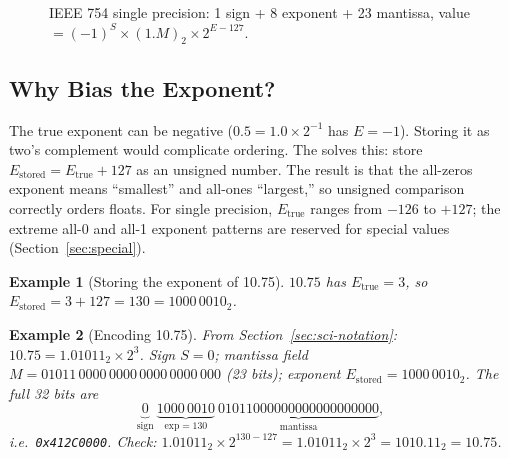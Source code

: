 \documentclass[11pt]{article}
\newtheorem{example}{Example}[section]
\begin{document}
\begin{figure}[h]
  \centering
  \caption{IEEE 754 single precision: 1 sign + 8 exponent + 23 mantissa, value $= (-1)^S \times (1.M)_2 \times 2^{E-127}$.}
  \label{fig:layout}
\end{figure}

\subsection{Why Bias the Exponent?}

The true exponent can be negative ($0.5 = 1.0 \times 2^{-1}$ has $E=-1$). Storing it as two's complement would complicate ordering. The  solves this: store $E_{\text{stored}} = E_{\text{true}} + 127$ as an unsigned number. The result is that the all-zeros exponent means ``smallest'' and all-ones ``largest,'' so unsigned comparison correctly orders floats. For single precision, $E_{\text{true}}$ ranges from $-126$ to $+127$; the extreme all-0 and all-1 exponent patterns are reserved for special values (Section~\ref{sec:special}).

\begin{example}[Storing the exponent of 10.75]
$10.75$ has $E_{\text{true}} = 3$, so $E_{\text{stored}} = 3 + 127 = 130 = 1000\,0010_2$.
\end{example}

\begin{example}[Encoding 10.75]
From Section~\ref{sec:sci-notation}: $10.75 = 1.01011_2 \times 2^3$. Sign $S=0$; mantissa field $M = 01011\,0000\,0000\,0000\,0000\,000$ (23 bits); exponent $E_{\text{stored}} = 1000\,0010_2$. The full 32 bits are
\[
  \underbrace{0}_{\text{sign}}
  \ \underbrace{1000\,0010}_{\text{exp}=130}
  \ \underbrace{01011000000000000000000}_{\text{mantissa}},
\]
i.e.\ \texttt{0x412C0000}. Check: $1.01011_2 \times 2^{130-127} = 1.01011_2 \times 2^3 = 1010.11_2 = 10.75$.
\end{example}
\end{document}
